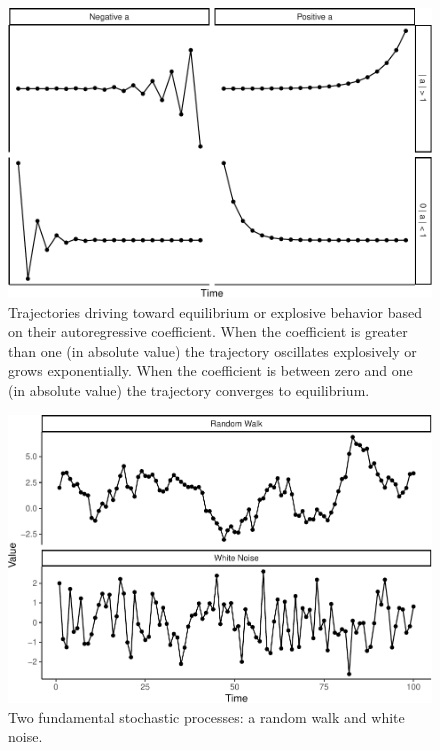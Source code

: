 \documentclass[english,,man]{apa6}
\theoremstyle{definition}
\theoremstyle{definition}
\theoremstyle{definition}
\theoremstyle{remark}
\begin{document}
\begin{figure}
\centering
\includegraphics{figs/unnamed-chunk-9-1.pdf}
\caption{\label{fig:unnamed-chunk-9}Trajectories driving toward equilibrium
or explosive behavior based on their autoregressive coefficient. When
the coefficient is greater than one (in absolute value) the trajectory
oscillates explosively or grows exponentially. When the coefficient is
between zero and one (in absolute value) the trajectory converges to
equilibrium.\label{dynamics_plot}}
\end{figure}

\begin{figure}
\centering
\includegraphics{figs/unnamed-chunk-10-1.pdf}
\caption{\label{fig:unnamed-chunk-10}Two fundamental stochastic processes: a
random walk and white noise.\label{noise}}
\end{figure}
\end{document}
